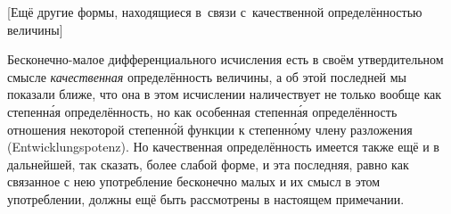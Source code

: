 \bigskip

%
{[Ещё другие формы, находящиеся в~связи с~качественной
определённостью величины]}

\label{bkm:bm53a}
Бесконечно-малое дифференциального исчисления есть в своём утвердительном
смысле {\em качественная} определённость величины, а об этой последней мы
показали ближе, что она в этом исчислении наличествует не только вообще как
степенн\'{а}я определённость, но как особенная степенн\'{а}я определённость
отношения некоторой степенн\'{о}й функции к степенн\'{о}му члену разложения
(Ent\-wick\-lungs\-potenz). Но качественная
определённость имеется также ещё и в дальнейшей, так сказать, более слабой
форме, и эта последняя, равно как связанное с нею употребление бесконечно малых
и их смысл в этом употреблении, должны ещё быть рассмотрены в настоящем
примечании.

